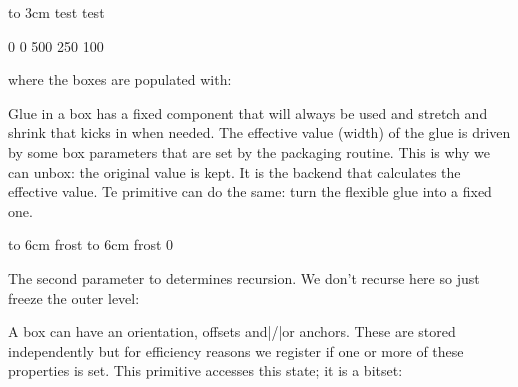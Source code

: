 \startbuffer[setthem]
 to 3cm{\hsize 2cm test test}
\stopbuffer

\startbuffer[usethem]
 0   %
 0   %
 500 %
 250 %
 100 %

\hpack\bgroup
    \quad{}\quad{}\quad{}\quad{}
\egroup
\stopbuffer

\typebuffer[usethem]

where the boxes are populated with:

\typebuffer[setthem]

\startlinecorrection
{}
\stoplinecorrection

\stopnewprimitive

\startnewprimitive[title={\prm {boxfreeze}}]

Glue in a box has a fixed component that will always be used and stretch and
shrink that kicks in when needed. The effective value (width) of the glue is
driven by some box parameters that are set by the packaging routine. This is why
we can unbox: the original value is kept. It is the backend that calculates the
effective value. Te  primitive can do the same: turn the flexible
glue into a fixed one.

\startbuffer
{} \hbox to 6cm {\hss frost}
 \hbox to 6cm {\hss frost}
 0
\stopbuffer

\typebuffer

The second parameter to  determines recursion. We don't recurse
here so just freeze the outer level:

\getbuffer

\stopnewprimitive

\startnewprimitive[title={\prm {boxgeometry}}]

A box can have an orientation, offsets and|/|or anchors. These are stored
independently but for efficiency reasons we register if one or more of these
properties is set. This primitive accesses this state; it is a bitset:


\stopnewprimitive

\startnewprimitive[title={\prm {boxinserts}}]

